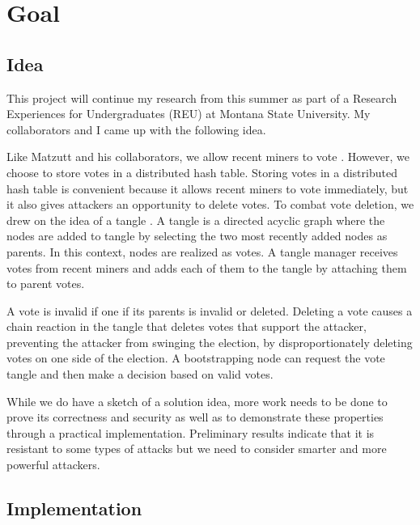 \section{Goal}		%
\label{sec:goal}

\subsection{Idea}

This project will continue my research from this summer as part of a Research Experiences for Undergraduates (REU) at Montana State University.
My collaborators and I came up with the following idea.

Like Matzutt and his collaborators, we allow recent miners to vote \cite{matzutt2020HowTSPrune}.
However, we choose to store votes in a distributed hash table.
Storing votes in a distributed hash table is convenient because it allows recent miners to vote immediately, but it also gives attackers an opportunity to delete votes.
To combat vote deletion, we drew on the idea of a tangle \cite{popov2016Tangle}.
A tangle is a directed acyclic graph where the nodes are added to tangle by selecting the two most recently added nodes as parents.
In this context, nodes are realized as votes.
A tangle manager receives votes from recent miners and adds each of them to the tangle by attaching them to parent votes.



A vote is invalid if one if its parents is invalid or deleted.
Deleting a vote causes a chain reaction in the tangle that deletes votes that support the attacker, preventing the attacker from swinging the election, by disproportionately deleting votes on one side of the election.
A bootstrapping node can request the vote tangle and then make a decision based on valid votes.

While we do have a sketch of a solution idea, more work needs to be done to prove its correctness and security as well as to demonstrate these properties through a practical implementation.
Preliminary results indicate that it is resistant to some types of attacks but we need to consider smarter and more powerful attackers.

\subsection{Implementation}

